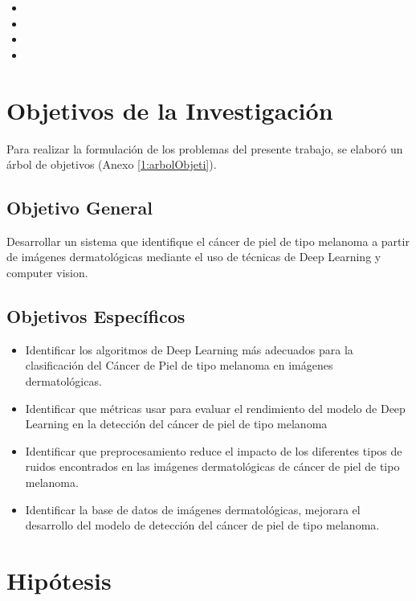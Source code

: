 \begin{itemize}
	\item \Pbone
	\item \Pbtwo
	\item \Pbthree
	\item \Pbfour
\end{itemize}

\section{Objetivos de la Investigación}

Para realizar la formulación de los problemas del presente trabajo, se elaboró un árbol de objetivos (Anexo \ref{1:arbolObjeti}).


\subsection{Objetivo General}
\newcommand{\ObjetivoGeneral}{
Desarrollar un sistema que identifique el cáncer de piel de tipo melanoma a partir de imágenes dermatológicas mediante el uso de técnicas de Deep Learning y computer vision.
}
\ObjetivoGeneral
\subsection{Objetivos Espec\'{i}ficos}
\newcommand{\Objone}{
Identificar los algoritmos de Deep Learning más adecuados para la clasificación del Cáncer de Piel de tipo melanoma en imágenes dermatológicas.
}
\newcommand{\Objtwo}{
Identificar que métricas usar para evaluar el rendimiento del modelo de Deep Learning en la detección del cáncer de piel de tipo melanoma
}
\newcommand{\Objthree}{
Identificar que preprocesamiento reduce el impacto de los diferentes tipos de ruidos encontrados en las imágenes dermatológicas de cáncer de piel de tipo melanoma.
}
\newcommand{\Objfour}{
Identificar la base de datos de imágenes dermatológicas, mejorara  el desarrollo del modelo de detección del  cáncer de piel de tipo melanoma.
}


\begin{itemize}
	\item {\Objone}
	\item {\Objtwo}
	\item {\Objthree}
	\item {\Objfour}
\end{itemize}

\section{Hipótesis}
